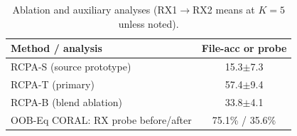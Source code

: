 \begin{table}[t]
\caption{Ablation and auxiliary analyses (RX1$\rightarrow$RX2 means at $K{=}5$ unless noted).}
\label{tab:ablation}
\centering
\begin{tabular}{lc}
\toprule
Method / analysis & File-acc or probe \\
\midrule
RCPA-S (source prototype) & 15.3$\pm$7.3 \\
RCPA-T (primary) & 57.4$\pm$9.4 \\
RCPA-B (blend ablation) & 33.8$\pm$4.1 \\
OOB-Eq CORAL: RX probe before/after & 75.1\% / 35.6\% \\
\bottomrule
\end{tabular}
\end{table}
